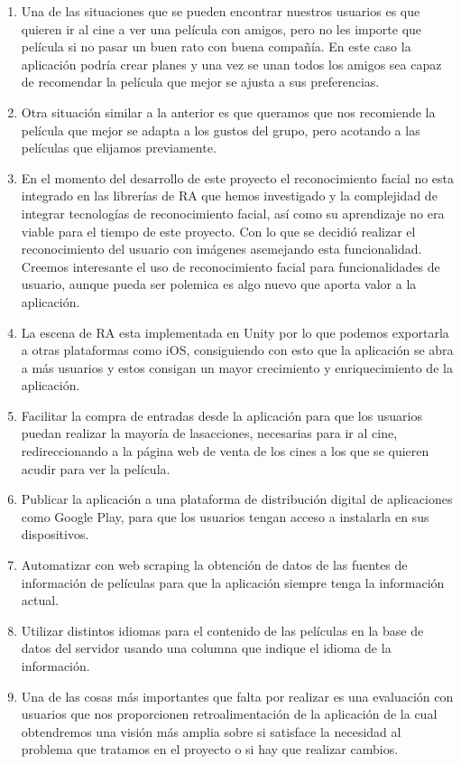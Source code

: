 \begin{enumerate}
    \item Una de las situaciones que se pueden encontrar nuestros usuarios es
     que quieren ir al cine a ver una película con amigos, pero no les importe
     que película si no pasar un buen rato con buena compañía. En este caso la
     aplicación podría crear planes y una vez se unan todos los amigos sea capaz
     de recomendar la película que mejor se ajusta a sus preferencias.
    \item Otra situación similar a la anterior es que queramos que nos
     recomiende la película que mejor se adapta a los gustos del grupo, pero
     acotando a las películas que elijamos previamente.
    \item En el momento del desarrollo de este proyecto el reconocimiento facial
     no esta integrado en las librerías de RA que hemos investigado y la
     complejidad de integrar tecnologías de reconocimiento facial, así como su
     aprendizaje no era viable para el tiempo de este proyecto.
    Con lo que se decidió realizar el reconocimiento del usuario con imágenes
     asemejando esta funcionalidad. Creemos interesante el uso de
     reconocimiento facial para funcionalidades de usuario, aunque pueda ser
     polemica es algo nuevo que aporta valor a la aplicación.
    \item La escena de RA esta implementada en Unity por lo que podemos
     exportarla a otras plataformas como iOS, consiguiendo con esto que la
     aplicación se abra a más usuarios y estos consigan un mayor crecimiento y
     enriquecimiento de la aplicación.
    \item Facilitar la compra de entradas desde la aplicación para que los
     usuarios puedan realizar la mayoría de lasacciones, necesarias para ir al
     cine, redireccionando a la página web de venta de los cines a los que se
     quieren acudir para ver la película.
    \item Publicar la aplicación a una plataforma de distribución digital de
    aplicaciones como Google Play, para que los usuarios tengan acceso a
    instalarla en sus dispositivos.
    \item Automatizar con web scraping la obtención de datos de las fuentes de
     información de películas para que la aplicación siempre tenga la
     información actual.
    \item Utilizar distintos idiomas para el contenido de las películas en la
     base de datos del servidor usando una columna que indique el idioma de la
     información.
    \item Una de las cosas más importantes que falta por realizar es una
     evaluación con usuarios que nos proporcionen retroalimentación de la
     aplicación de la cual obtendremos una visión más amplia sobre si satisface
     la necesidad al problema que tratamos en el proyecto o si hay que realizar
     cambios. 
\end{enumerate}